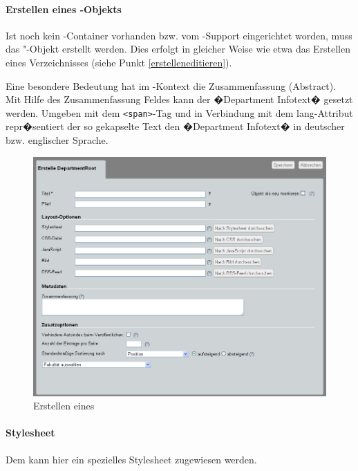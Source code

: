 \paragraph{Erstellen eines -Objekts}

Ist noch kein -Container vorhanden bzw. vom
-Support eingerichtet worden, muss das "-Objekt
erstellt werden. Dies erfolgt in gleicher Weise wie etwa das Erstellen
eines Verzeichnisses (siehe Punkt \ref{erstelleneditieren}).

\begin{Hinweis}
  Eine besondere Bedeutung hat im -Kontext
  die Zusammenfassung (Abstract). Mit Hilfe des Zusammenfassung Feldes
  kann der �Department Infotext� gesetzt werden. Umgeben mit dem
  \texttt{<span>}-Tag und in Verbindung mit dem lang-Attribut
  repr�sentiert der so gekapselte Text den �Department Infotext� in
  deutscher bzw. englischer Sprache.
\end{Hinweis}

\begin{figure}[!ht]
  \centering
  \includegraphics[width=\textwidth]{./images/create-departmentroot.png}
  \caption{Erstellen eines }
  \label{fig:erstellendepartmentroot}
\end{figure}

\paragraph{Stylesheet}
Dem  kann hier ein spezielles Stylesheet zugewiesen werden.

